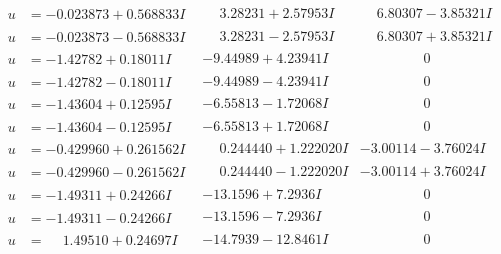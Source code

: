 \documentclass[1p]{elsarticle_modified}
\theoremstyle{definition}
\begin{document}
$$\begin{array}{c|c|c}
\begin{aligned}
u &= -0.023873 + 0.568833 I\end{aligned}
 & \phantom{-}3.28231 + 2.57953 I & \phantom{-}6.80307 - 3.85321 I \\ \hline\begin{aligned}
u &= -0.023873 - 0.568833 I\end{aligned}
 & \phantom{-}3.28231 - 2.57953 I & \phantom{-}6.80307 + 3.85321 I \\ \hline\begin{aligned}
u &= -1.42782 + 0.18011 I\end{aligned}
 & -9.44989 + 4.23941 I & \phantom{-0.000000 } 0 \\ \hline\begin{aligned}
u &= -1.42782 - 0.18011 I\end{aligned}
 & -9.44989 - 4.23941 I & \phantom{-0.000000 } 0 \\ \hline\begin{aligned}
u &= -1.43604 + 0.12595 I\end{aligned}
 & -6.55813 - 1.72068 I & \phantom{-0.000000 } 0 \\ \hline\begin{aligned}
u &= -1.43604 - 0.12595 I\end{aligned}
 & -6.55813 + 1.72068 I & \phantom{-0.000000 } 0 \\ \hline\begin{aligned}
u &= -0.429960 + 0.261562 I\end{aligned}
 & \phantom{-}0.244440 + 1.222020 I & -3.00114 - 3.76024 I \\ \hline\begin{aligned}
u &= -0.429960 - 0.261562 I\end{aligned}
 & \phantom{-}0.244440 - 1.222020 I & -3.00114 + 3.76024 I \\ \hline\begin{aligned}
u &= -1.49311 + 0.24266 I\end{aligned}
 & -13.1596 + 7.2936 I & \phantom{-0.000000 } 0 \\ \hline\begin{aligned}
u &= -1.49311 - 0.24266 I\end{aligned}
 & -13.1596 - 7.2936 I & \phantom{-0.000000 } 0 \\ \hline\begin{aligned}
u &= \phantom{-}1.49510 + 0.24697 I\end{aligned}
 & -14.7939 - 12.8461 I & \phantom{-0.000000 } 0 \\ \hline\begin{aligned}

\end{aligned}
\end{array}$$
\end{document}
